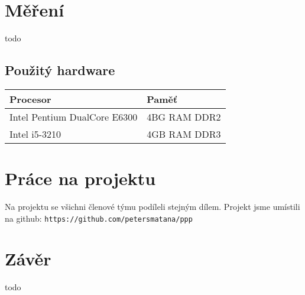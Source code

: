 \documentclass{article}
\begin{document}
\section{Měření}
{\color{red}todo}

\subsection{Použitý hardware}
\begin{tabular}{ l | l }
	\textbf{Procesor} & \textbf{Paměť} \\
	\hline
	\hline
	Intel Pentium DualCore E6300 & 4BG RAM DDR2 \\
	\hline
	Intel i5-3210 & 4GB RAM DDR3 \\
\end{tabular}

\section{Práce na projektu}
Na projektu se všichni členové týmu podíleli stejným dílem. Projekt jsme
umístili na github: \texttt{https://github.com/petersmatana/ppp}

\section{Závěr}
{\color{red}todo}
\end{document}
